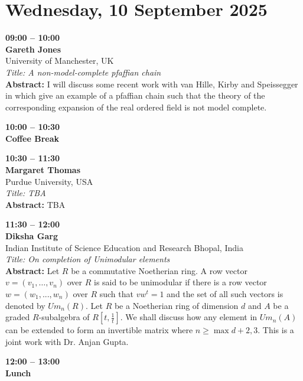 \documentclass[10pt,a4paper]{article}
\begin{document}
\section{Wednesday, 10 September 2025}
\begin{tcolorbox}[talkbox]
\textbf{09:00 -- 10:00} \\
\textbf{Gareth Jones} \\
University of Manchester, UK \\
\textit{Title: A non-model-complete pfaffian chain} \\
\textbf{Abstract:} I will discuss some recent work with van Hille, Kirby and Speissegger in which give an example of a pfaffian chain such that the theory of the corresponding expansion of the real ordered field is not model complete.
\end{tcolorbox}
\begin{tcolorbox}[talkbox]
\textbf{10:00 -- 10:30} \\
\textbf{Coffee Break} 
\end{tcolorbox}
\begin{tcolorbox}[talkbox]
\textbf{10:30 -- 11:30} \\
\textbf{Margaret Thomas} \\
Purdue University, USA \\
\textit{Title: TBA} \\
\textbf{Abstract:} TBA
\end{tcolorbox}
\begin{tcolorbox}[talkbox]
\textbf{11:30 -- 12:00} \\
\textbf{Diksha Garg} \\
Indian Institute of Science Education and Research Bhopal, India \\
\textit{Title: On completion of Unimodular elements} \\
\textbf{Abstract:} Let $R$ be a commutative Noetherian ring. A row vector $v = (v_1, \ldots, v_n)$ over $R$ is said to be unimodular if there is a row vector $w = (w_1, . . . , w_n)$ over $R$ such that $vw^t = 1$ and the set of all such vectors is denoted by $Um_n(R)$. Let $R$ be a Noetherian ring of dimension $d$ and $A$ be a graded $R$-subalgebra of $R\left[t, \frac{1}{t}\right]$. We shall discuss how any element in $Um_n(A)$ can be extended to form an invertible matrix where $n \ge \max{d + 2, 3}$. This is a joint work with Dr. Anjan Gupta.
\end{tcolorbox}
\begin{tcolorbox}[talkbox]
\textbf{12:00 -- 13:00} \\
\textbf{Lunch}
\end{tcolorbox}
\end{document}
